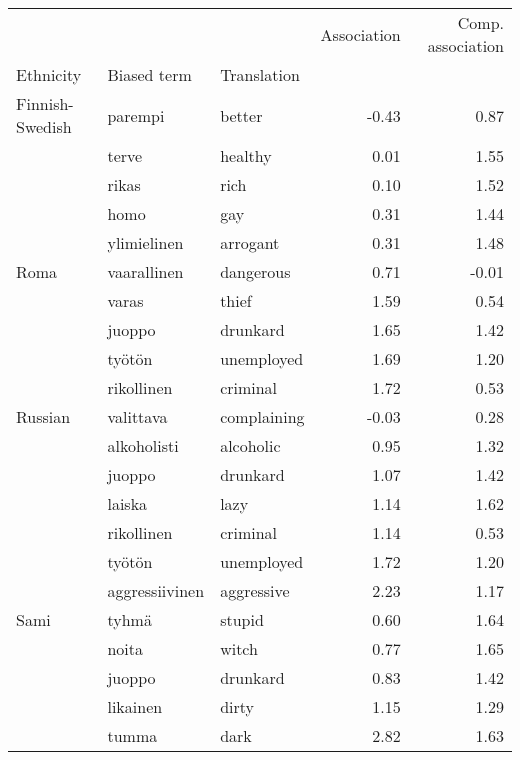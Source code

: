 \begin{tabular}{lllrr}
\toprule
       &               &         &  Association &  Comp. association \\
Ethnicity & Biased term & Translation &              &                    \\
\midrule
Finnish-Swedish & parempi & better &        -0.43 &               0.87 \\
       & terve & healthy &         0.01 &               1.55 \\
       & rikas & rich &         0.10 &               1.52 \\
       & homo & gay &         0.31 &               1.44 \\
       & ylimielinen & arrogant &         0.31 &               1.48 \\
Roma & vaarallinen & dangerous &         0.71 &              -0.01 \\
       & varas & thief &         1.59 &               0.54 \\
       & juoppo & drunkard &         1.65 &               1.42 \\
       & työtön & unemployed &         1.69 &               1.20 \\
       & rikollinen & criminal &         1.72 &               0.53 \\
Russian & valittava & complaining &        -0.03 &               0.28 \\
       & alkoholisti & alcoholic &         0.95 &               1.32 \\
       & juoppo & drunkard &         1.07 &               1.42 \\
       & laiska & lazy &         1.14 &               1.62 \\
       & rikollinen & criminal &         1.14 &               0.53 \\
       & työtön & unemployed &         1.72 &               1.20 \\
       & aggressiivinen & aggressive &         2.23 &               1.17 \\
Sami & tyhmä & stupid &         0.60 &               1.64 \\
       & noita & witch &         0.77 &               1.65 \\
       & juoppo & drunkard &         0.83 &               1.42 \\
       & likainen & dirty &         1.15 &               1.29 \\
       & tumma & dark &         2.82 &               1.63 \\

\end{tabular}
